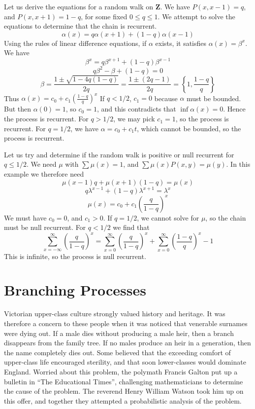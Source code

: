 \begin{example}
    Let us derive the equations for a random walk on $\mathbf{Z}$. We have $P(x,x-1) = q$, and $P(x,x+1) = 1-q$, for some fixed $0 \leq q \leq 1$. We attempt to solve the equations to determine that the chain is recurrent.
    \[ \alpha(x) = q \alpha(x+1) + (1 - q)\alpha(x-1) \]
    Using the rules of linear difference equations, if $\alpha$ exists, it satisfies $\alpha(x) = \beta^x$. We have
    \[ \beta^x = q\beta^{x+1} + (1-q)\beta^{x-1} \]
    \[ q\beta^2 - \beta + (1 - q) = 0 \]
    \[ \beta = \frac{1 \pm \sqrt{1 - 4q(1-q)}}{2q} = \frac{1 \pm (2q - 1)}{2q} = \left\{ 1, \frac{1-q}{q} \right\} \]
    Thus $\alpha(x) = c_0 + c_1 \left( \frac{1-q}{q} \right)^x$
    If $q < 1/2$, $c_1 = 0$ because $\alpha$ must be bounded. But then $\alpha(0) = 1$, so $c_0 = 1$, and this contradicts that $\inf \alpha(x) = 0$. Hence the process is recurrent. For $q > 1/2$, we may pick $c_1 = 1$, so the process is recurrent. For $q = 1/2$, we have $\alpha = c_0 + c_1 t$, which cannot be bounded, so the process is recurrent.

    Let us try and determine if the random walk is positive or null recurrent for $q \leq 1/2$. We need $\mu$ with $\sum \mu(x) = 1$, and $\sum \mu(x) P(x,y) = \mu(y)$. In this example we therefore need
    \[ \mu(x-1) q + \mu(x+1)(1 -q) = \mu(x) \]
    \[ q\lambda^{x-1} + (1 - q)\lambda^{x+1} = \lambda^x \]
    \[ \mu(x) = c_0 + c_1 \left( \frac{q}{1-q} \right)^x \]
    We must have $c_0 = 0$, and $c_1 > 0$. If $q = 1/2$, we cannot solve for $\mu$, so the chain must be null recurrent. For $q < 1/2$ we find that
    \[ \sum_{x = -\infty}^\infty \left( \frac{q}{1-q} \right)^x = \sum_{x = 0}^\infty \left( \frac{q}{1-q} \right)^x + \sum_{x = 0}^\infty \left( \frac{1-q}{q} \right)^x - 1 \]
    This is infinite, so the process is null recurrent.
\end{example}

\section{Branching Processes}

Victorian upper-class culture strongly valued history and heritage. It was therefore a concern to these people when it was noticed that venerable surnames were dying out. If a male dies without producing a male heir, then a branch disappears from the family tree. If no males produce an heir in a generation, then the name completely dies out. Some believed that the exceeding comfort of upper-class life encouraged sterility, and that soon lower-classes would dominate England. Worried about this problem, the polymath Francis Galton put up a bulletin in ``The Educational Times'', challenging mathematicians to determine the cause of the problem. The reverend Henry William Watson took him up on this offer, and together they attempted a probabilistic analysis of the problem.

